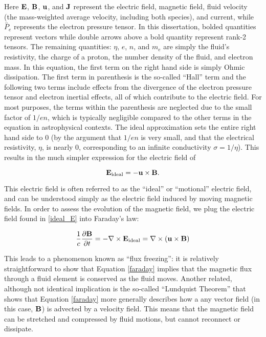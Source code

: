 Here $\bold{E}$, $\bold{B}$, $\bold{u}$, and $\bold{J}$ represent the electric field, magnetic field, fluid velocity (the mass-weighted average velocity, including both species), and current, while $\overleftrightarrow{P_e}$ represents the electron pressure tensor.  In this dissertation, bolded quantities represent vectors while double arrows above a bold quantity represent rank-2 tensors.  The remaining quantities: $\eta$, $e$, $n$, and $m_e$ are simply the fluid's resistivity, the charge of a proton, the number density of the fluid, and electron mass.  In this equation, the first term on the right hand side is simply Ohmic dissipation. The first term in parenthesis is the so-called ``Hall'' term and the following two terms include effects from the divergence of the electron pressure tensor and electron inertial effects, all of which contribute to the electric field.  For most purposes, the terms within the parenthesis are neglected due to the small factor of $1/en$, which is typically negligible compared to the other terms in the equation in astrophysical contexts.  The ideal approximation sets the entire right hand side to 0 (by the argument that $1/en$ is very small, and that the electrical resistivity, $\eta$, is nearly 0, corresponding to an infinite conductivity $\sigma=1/\eta$).  This results in the much simpler expression for the electric field of

\begin{equation}
	\bold{E}_{\rm{ideal}}=-\bold{u}\times \bold{B}.
	\label{ideal_E}
\end{equation} 

This electric field is often referred to as the ``ideal'' or ``motional'' electric field, and can be understood simply as the electric field induced by moving magnetic fields.  In order to assess the evolution of the magnetic field, we plug the electric field found in \ref{ideal_E} into Faraday's law:

\begin{equation}
	\frac{1}{c}\frac{\partial \bold{B}}{\partial t} = - \nabla \times \bold{E_{\rm{ideal}}}=\nabla \times (\bold{u}\times\bold{B})
	\label{faraday}
\end{equation}

This leads to a phenomenon known as ``flux freezing'': it is relatively straightforward to show that Equation \ref{faraday} implies that the magnetic flux through a fluid element is conserved as the fluid moves.  Another related, although not identical implication is the so-called ``Lundquist Theorem'' that shows that Equation \ref{faraday} more generally describes how a any vector field (in this case, $\bold{B}$) is advected by a velocity field.  This means that the magnetic field can be stretched and compressed by fluid motions, but cannot reconnect or dissipate.

